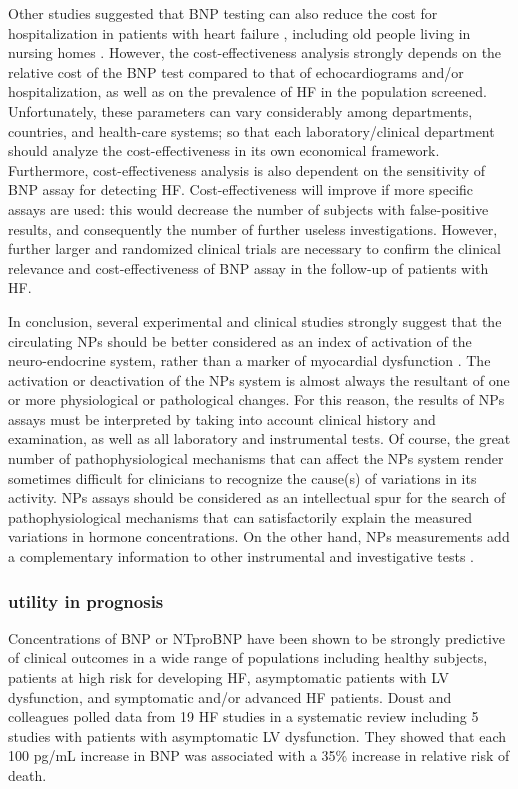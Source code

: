 \documentclass[14pt,a4paper,onecolumn]{extarticle}
\begin{document}
Other studies suggested that BNP testing can also reduce the cost for hospitalization in patients with heart failure \citep{bib3263} \citep{bib3264}, including old people living in nursing homes \citep{bib3147}.  However, the cost-effectiveness analysis strongly depends on the relative cost of the BNP test compared to that of echocardiograms and/or hospitalization, as well as on the prevalence of HF in the population screened. Unfortunately, these parameters can vary considerably among departments, countries, and health-care systems; so that each laboratory/clinical department should analyze the cost-effectiveness in its own economical framework. Furthermore, cost-effectiveness analysis is also dependent on the sensitivity of BNP assay for detecting HF. Cost-effectiveness will improve if more specific assays are used: this would decrease the number of subjects with false-positive results, and consequently the number of further useless investigations. However, further larger and randomized clinical trials are necessary to confirm the clinical relevance and cost-effectiveness of BNP assay in the follow-up of patients with HF.

In conclusion, several  experimental and clinical studies strongly suggest that the circulating NPs should be better considered as an index of activation of the neuro-endocrine system, rather than a marker of myocardial dysfunction \citep{bib3298}. The activation or deactivation of the NPs system is almost always the resultant of one or more physiological or pathological changes. For this reason, the results of NPs assays must be interpreted by taking into account clinical history and examination, as well as all laboratory and instrumental tests. Of course, the great number of pathophysiological mechanisms that can affect the NPs system render sometimes difficult for clinicians to recognize the cause(s) of variations in its activity. NPs assays should be considered as an intellectual spur for the search of pathophysiological mechanisms that can satisfactorily explain the measured variations in hormone concentrations. On the other hand, NPs measurements add a complementary information to other instrumental and investigative tests \citep{bib3296}.

\clearpage
\subsubsection{utility in prognosis}

Concentrations of BNP or NTproBNP have been shown to be strongly predictive of clinical outcomes in a wide range of populations including healthy subjects, patients at high risk for developing HF, asymptomatic patients with LV dysfunction, and symptomatic and/or advanced HF patients. Doust and colleagues polled data from 19 HF studies in a systematic review including 5 studies with patients with asymptomatic LV dysfunction. They showed that each 100 pg/mL increase in BNP was associated with a 35\% increase in relative risk of death. \citep{bib3186}
\end{document}
